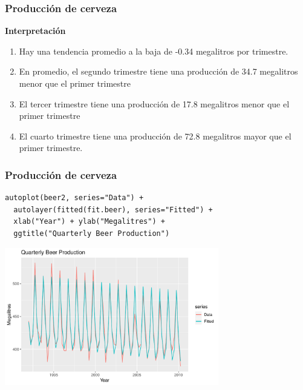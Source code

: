 \documentclass[10pt]{beamer}
\begin{document}



\begin{frame}[fragile]
\frametitle{Producción de cerveza}

\textbf{Interpretación}
\vspace{4mm}

\begin{enumerate}
\item Hay una tendencia promedio a la baja de -0.34 megalitros por trimestre. 
\vspace{3mm}
\item En promedio, el segundo trimestre tiene una producción de 34.7 megalitros menor que el primer trimestre
\vspace{3mm}
\item El tercer trimestre tiene una producción de 17.8 megalitros menor que el primer trimestre
\vspace{3mm}
\item El cuarto trimestre tiene una producción de 72.8 megalitros mayor que el primer trimestre. 
\end{enumerate}



\end{frame}





\begin{frame}[fragile]
\frametitle{Producción de cerveza}


\lstset{language=r,label= ,caption= ,captionpos=b,numbers=none}
\begin{lstlisting}
autoplot(beer2, series="Data") +
  autolayer(fitted(fit.beer), series="Fitted") +
  xlab("Year") + ylab("Megalitres") +
  ggtitle("Quarterly Beer Production")
\end{lstlisting}

\pause

\begin{center}
\includegraphics[width=0.7\textwidth]{5-regression_files/figure-beamer/unnamed-chunk-6-1.pdf}
\end{center}


\end{frame}
\end{document}

